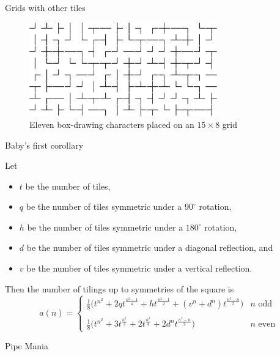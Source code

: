 \documentclass{beamer}%
\newcommand\paren[1]{\biggl(#1\biggr)}
\begin{document}
\begin{frame}{Grids with other tiles} %
    \begin{figure}
      
      \includegraphics[width=230pt]{pseudomaze2.png}
      \caption{Eleven box-drawing characters placed on an $15 \times 8$ grid}
    \end{figure}
\end{frame}

\begin{frame}{Baby's first corollary}
  \begin{corollary}
    Let \begin{itemize}
      \item $t$ be the number of tiles,
      \item $q$ be the number of tiles symmetric under a $90^\circ$ rotation,
      \item $h$ be the number of tiles symmetric under a $180^\circ$ rotation,
      \item $d$ be the number of tiles symmetric under a diagonal reflection, and
      \item $v$ be the number of tiles symmetric under a vertical reflection.
    \end{itemize}
    Then the number of tilings up to symmetries of the square is
  \[
    a(n) = \begin{cases}
      \frac 18 \paren{
        t^{n^2} + 2qt^{\frac{n^2-1}{4}} + ht^{\frac{n^2-1}{2}} + (v^n + d^n)t^{\frac{n^2-n}{2}}
      } & n \text{ odd} \\
      \\
      \frac 18 \paren{
        t^{n^2} + 3t^{\frac{n^2}{2}} + 2t^{\frac{n^2}{4}} + 2d^n t^{\frac{n^2-n}{2}}
      } & n \text{ even}
    \end{cases}
  \]
  \end{corollary}
\end{frame}

\begin{frame}{Pipe Mania}
\end{frame}
\end{document}

